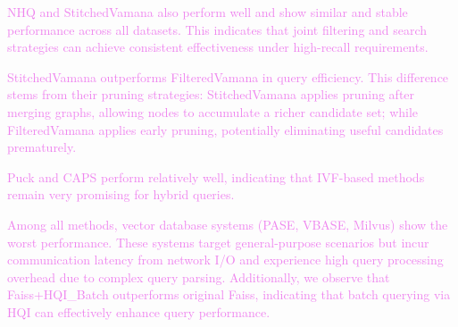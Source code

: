 \documentclass[sigconf, nonacm]{acmart}
\begin{document}
{	\textcolor{violet}{NHQ and StitchedVamana also perform well and show similar and stable performance across all datasets. This indicates that joint filtering and search strategies can achieve consistent effectiveness under high-recall requirements.}
	
	\textcolor{violet}{StitchedVamana outperforms FilteredVamana in query efficiency. This difference stems from their pruning strategies: StitchedVamana applies pruning after merging graphs, allowing nodes to accumulate a richer candidate set; while FilteredVamana applies early pruning, potentially eliminating useful candidates prematurely.}
	
	
	\textcolor{violet}{Puck and CAPS perform relatively well, indicating that IVF-based methods remain very promising for hybrid queries.}
	
	\textcolor{violet}{Among all methods, vector database systems (PASE, VBASE, Milvus) show the worst performance. These systems target general-purpose scenarios but incur communication latency from network I/O and experience high query processing overhead due to complex query parsing. Additionally, we observe that Faiss+HQI\_Batch outperforms original Faiss, indicating that batch querying via HQI can effectively enhance query performance.}
	
	
}
\end{document}

